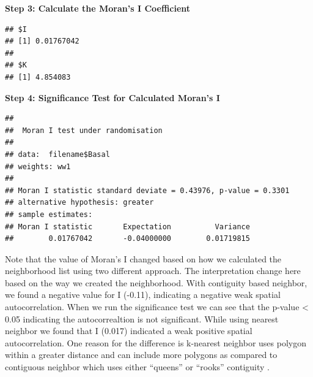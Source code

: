 \documentclass[
]{book}
\newenvironment{Shaded}{\begin{snugshade}}{\end{snugshade}}
\newcommand{\AttributeTok}[1]{\textcolor[rgb]{0.13,0.29,0.53}{#1}}
\newcommand{\DocumentationTok}[1]{\textcolor[rgb]{0.56,0.35,0.01}{\textbf{\textit{#1}}}}
\newcommand{\FunctionTok}[1]{\textcolor[rgb]{0.13,0.29,0.53}{\textbf{#1}}}
\newcommand{\NormalTok}[1]{#1}
\newcommand{\SpecialCharTok}[1]{\textcolor[rgb]{0.81,0.36,0.00}{\textbf{#1}}}
\begin{document}
\textbf{Step 3: Calculate the Moran's I Coefficient}

\begin{Shaded}
\end{Shaded}

\begin{verbatim}
## $I
## [1] 0.01767042
## 
## $K
## [1] 4.854083
\end{verbatim}

\textbf{Step 4: Significance Test for Calculated Moran's I}

\begin{Shaded}
\end{Shaded}

\begin{verbatim}
## 
##  Moran I test under randomisation
## 
## data:  filename$Basal  
## weights: ww1    
## 
## Moran I statistic standard deviate = 0.43976, p-value = 0.3301
## alternative hypothesis: greater
## sample estimates:
## Moran I statistic       Expectation          Variance 
##        0.01767042       -0.04000000        0.01719815
\end{verbatim}

Note that the value of Moran's I changed based on how we calculated the neighborhood list using two different approach. The interpretation change here based on the way we created the neighborhood. With contiguity based neighbor, we found a negative value for I (-0.11), indicating a negative weak spatial autocorrelation. When we run the significance test we can see that the p-value \textless{} 0.05 indicating the autocorrealtion is not significant. While using nearest neighbor we found that I (0.017) indicated a weak positive spatial autocorrelation. One reason for the difference is k-nearest neighbor uses polygon within a greater distance and can include more polygons as compared to contiguous neighbor which uses either ``queens'' or ``rooks'' contiguity \citep{suryowati_comparison_2018}.
\end{document}
